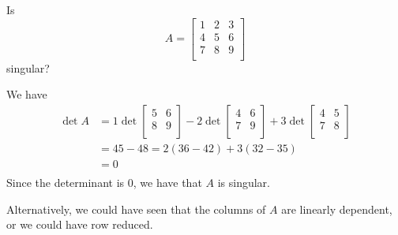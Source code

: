 \documentclass{article}
\begin{document}
\begin{example}
  Is \[
    A =
    \begin{bmatrix}
      1 & 2 & 3 \\
      4 & 5 & 6 \\
      7 & 8 & 9 \\
    \end{bmatrix}
  \] singular?

  We have
  \begin{align*}
    \det A & = 1 \det
    \begin{bmatrix}
      5 & 6 \\
      8 & 9 \\
    \end{bmatrix} - 2 \det
    \begin{bmatrix}
      4 & 6 \\
      7 & 9 \\
    \end{bmatrix} + 3 \det
    \begin{bmatrix}
      4 & 5 \\
      7 & 8 \\
    \end{bmatrix}                               \\
           & = 45 - 48 = 2(36 - 42) + 3(32 - 35) \\
           & = 0                                 \\
  \end{align*}
  Since the determinant is $0$, we have that $A$ is singular.

  Alternatively, we could have seen that the columns of $A$ are linearly dependent, or we could have row reduced.
\end{example}
\end{document}
